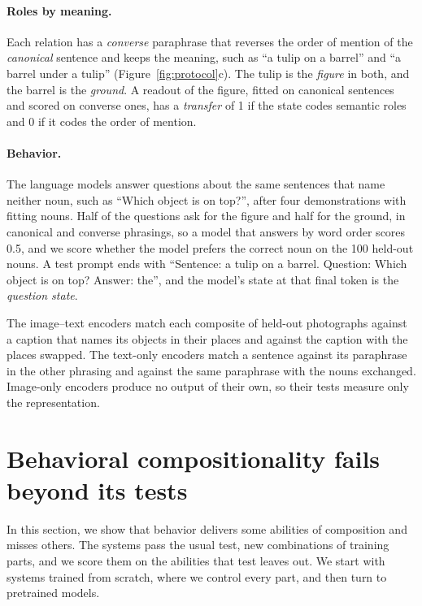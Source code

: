 \documentclass[10pt]{article}
\theoremstyle{plain}
\theoremstyle{remark}
\begin{document}
\paragraph{Roles by meaning.} Each relation has a \emph{converse} paraphrase that reverses the order of mention of the \emph{canonical} sentence and keeps the meaning, such as ``a tulip on a barrel'' and ``a barrel under a tulip'' (Figure~\ref{fig:protocol}c). The tulip is the \emph{figure} in both, and the barrel is the \emph{ground}. A readout of the figure, fitted on canonical sentences and scored on converse ones, has a \emph{transfer} of 1 if the state codes semantic roles and 0 if it codes the order of mention.

\paragraph{Behavior.} The language models answer questions about the same sentences that name neither noun, such as ``Which object is on top?'', after four demonstrations with fitting nouns. Half of the questions ask for the figure and half for the ground, in canonical and converse phrasings, so a model that answers by word order scores 0.5, and we score whether the model prefers the correct noun on the 100 held-out nouns. A test prompt ends with ``Sentence: a tulip on a barrel. Question: Which object is on top? Answer: the'', and the model's state at that final token is the \emph{question state}.

The image--text encoders match each composite of held-out photographs against a caption that names its objects in their places and against the caption with the places swapped. The text-only encoders match a sentence against its paraphrase in the other phrasing and against the same paraphrase with the nouns exchanged. Image-only encoders produce no output of their own, so their tests measure only the representation.

\section{Behavioral compositionality fails beyond its tests}
\label{sec:results}

In this section, we show that behavior delivers some abilities of composition and misses others. The systems pass the usual test, new combinations of training parts, and we score them on the abilities that test leaves out. We start with systems trained from scratch, where we control every part, and then turn to pretrained models.
\end{document}
